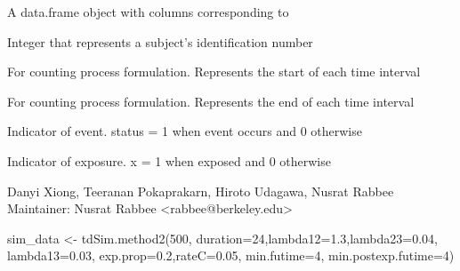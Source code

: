 \documentclass[a4paper]{book}
\begin{document}
%
\begin{Value}





A data.frame object with columns corresponding to
\begin{ldescription}
\item[\code{id}] 
Integer that represents a subject's identification number

\item[\code{start}] 
For counting process formulation. Represents the start of each time interval

\item[\code{stop}] 
For counting process formulation. Represents the end of each time interval

\item[\code{status}] 
Indicator of event. status = 1 when event occurs and 0 otherwise

\item[\code{x}] 
Indicator of exposure. x = 1 when exposed and 0 otherwise

\end{ldescription}
\end{Value}
%
\begin{Author}\relax
Danyi Xiong, Teeranan Pokaprakarn, Hiroto Udagawa, Nusrat Rabbee \\{}
Maintainer: Nusrat Rabbee <rabbee@berkeley.edu>
\end{Author}
%
\begin{Examples}
\begin{ExampleCode}
sim_data <- tdSim.method2(500, duration=24,lambda12=1.3,lambda23=0.04, 
    lambda13=0.03, exp.prop=0.2,rateC=0.05, min.futime=4, min.postexp.futime=4)
\end{ExampleCode}
\end{Examples}
\printindex{}
\end{document}
